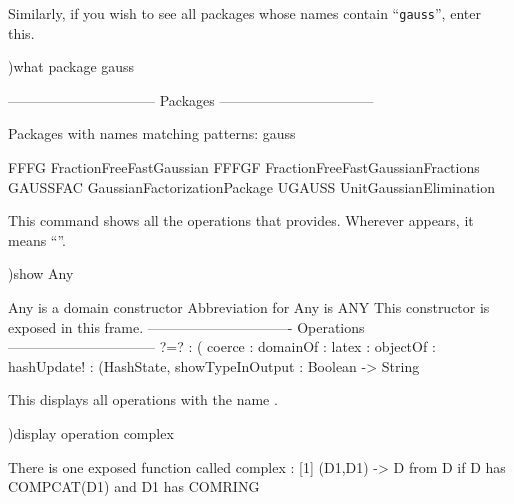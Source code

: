 \begin{xtc}
\begin{xtccomment}
Similarly, if you wish to see all packages whose names contain
``{\tt gauss}'', enter this.
\end{xtccomment}
\begin{spadsrc}
)what package gauss
\end{spadsrc}
\begin{SysCmdOutput}
-------------------------------- Packages ---------------------------------

Packages with names matching patterns:
     gauss 

 FFFG     FractionFreeFastGaussian
 FFFGF    FractionFreeFastGaussianFractions
 GAUSSFAC GaussianFactorizationPackage  UGAUSS   UnitGaussianElimination
\end{SysCmdOutput}
\end{xtc}
\begin{xtc}
\begin{xtccomment}
This command shows all
the operations that  provides.
Wherever \spadSyntax{$} appears, it means ``''.
\end{xtccomment}
\begin{spadsrc}
)show Any
\end{spadsrc}
\begin{SysCmdOutput}
 Any is a domain constructor
 Abbreviation for Any is ANY 
 This constructor is exposed in this frame.
------------------------------- Operations --------------------------------
 ?=? : (%
 coerce : %
 domainOf : %
 latex : %
 objectOf : %
 hashUpdate! : (HashState,%
 showTypeInOutput : Boolean -> String

\end{SysCmdOutput}
\end{xtc}
\begin{xtc}
\begin{xtccomment}
This displays all operations with the name .
\end{xtccomment}
\begin{spadsrc}
)display operation complex
\end{spadsrc}
\begin{SysCmdOutput}

There is one exposed function called complex :
   [1] (D1,D1) -> D from D if D has COMPCAT(D1) and D1 has COMRING
\end{SysCmdOutput}
\end{xtc}
